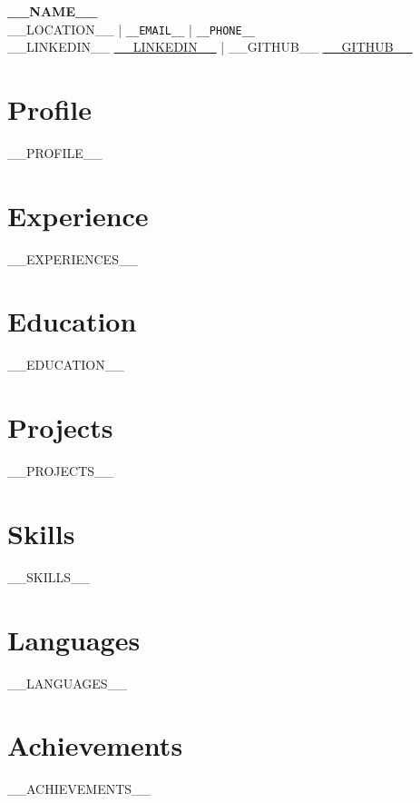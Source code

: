 \documentclass[11pt,a4paper]{article}
\begin{document}
\begin{center}
    {\LARGE \textbf{__NAME__}}\\
    \vspace{0.5em}
    __LOCATION__ \quad| \quad \texttt{__EMAIL__} \quad| \quad \texttt{__PHONE__} \\
    \if\relax{}\relax
        __LINKEDIN__
    \else
        \href{https://__LINKEDIN__}{__LINKEDIN__}
    \fi
    \quad| \quad
    \if\relax{}\relax
        __GITHUB__
    \else
        \href{https://__GITHUB__}{__GITHUB__}
    \fi
\end{center}

\vspace{1em}

\section*{Profile}
__PROFILE__

\section*{Experience}
__EXPERIENCES__

\section*{Education}
__EDUCATION__

\section*{Projects}
__PROJECTS__

\section*{Skills}
__SKILLS__

\section*{Languages}
__LANGUAGES__

\section*{Achievements}
__ACHIEVEMENTS__
\end{document}
